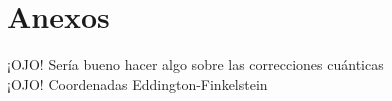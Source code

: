 \documentclass{article}
\numberwithin{equation}{section}
\begin{document}
\section{Anexos}

¡OJO! Sería bueno hacer algo sobre las correcciones cuánticas\\


¡OJO! Coordenadas Eddington-Finkelstein\\


%
%
%
%
%
%
%
%
%
%
%
%
%
%

\nocite{*}


\end{document}
